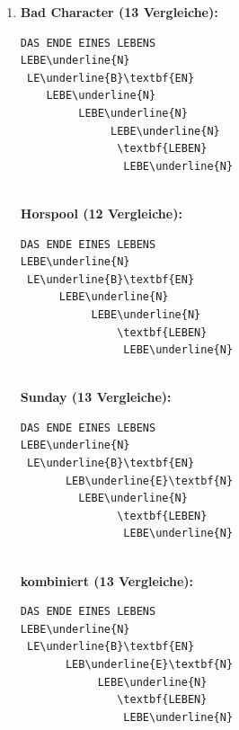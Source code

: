 \documentclass[11pt,a4paper]{article}
\begin{document}
\begin{loesung}
\begin{enumerate}
        \item
        \textbf{Bad Character\textnormal{ (13 Vergleiche)}:}\\
        \begin{minipage}[t]{0.95\textwidth}
        \begin{Verbatim}[commandchars=\\\{\}]
DAS ENDE EINES LEBENS
LEBE\underline{N}
 LE\underline{B}\textbf{EN}
    LEBE\underline{N}
         LEBE\underline{N}
              LEBE\underline{N}
               \textbf{LEBEN}
                LEBE\underline{N}
        \end{Verbatim}
        \end{minipage} \\

        \textbf{Horspool\textnormal{ (12 Vergleiche)}:}\\
        \begin{minipage}[t]{0.95\textwidth}
        \begin{Verbatim}[commandchars=\\\{\}]
DAS ENDE EINES LEBENS
LEBE\underline{N}
 LE\underline{B}\textbf{EN}
      LEBE\underline{N}
           LEBE\underline{N}
               \textbf{LEBEN}
                LEBE\underline{N}
        \end{Verbatim}
        \end{minipage} \\

        \textbf{Sunday\textnormal{ (13 Vergleiche)}:}\\
        \begin{minipage}[t]{0.95\textwidth}
        \begin{Verbatim}[commandchars=\\\{\}]
DAS ENDE EINES LEBENS
LEBE\underline{N}
 LE\underline{B}\textbf{EN}
       LEB\underline{E}\textbf{N}
         LEBE\underline{N}
               \textbf{LEBEN}
                LEBE\underline{N}
        \end{Verbatim}
        \end{minipage} \\

        \textbf{kombiniert\textnormal{ (13 Vergleiche)}:}\\
        \begin{minipage}[t]{0.95\textwidth}
        \begin{Verbatim}[commandchars=\\\{\}]
DAS ENDE EINES LEBENS
LEBE\underline{N}
 LE\underline{B}\textbf{EN}
       LEB\underline{E}\textbf{N}
            LEBE\underline{N}
               \textbf{LEBEN}
                LEBE\underline{N}
        \end{Verbatim}
        \end{minipage}


\end{enumerate}
\end{loesung}
\end{document}
